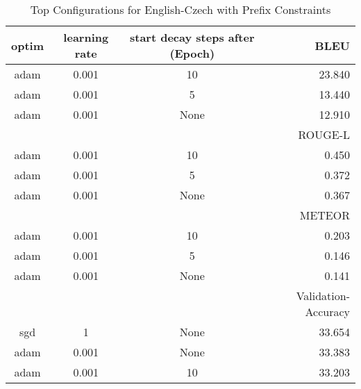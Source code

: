 \begin{table}
	\caption{Top Configurations for English-Czech with Prefix Constraints}
	\label{tab:optim_tagged-cs-en}
	\centering
\begin{tabular}{|c|c|c|r|}
	\hline
	optim   & learning rate & start decay steps after (Epoch)  & BLEU\\
	\hline
		adam   &     0.001     &       10    & 23.840 \\
		adam   &     0.001     &       5     & 13.440 \\
		adam   &     0.001     &       None  & 12.910 \\
	\hline
	\hline
	& & & ROUGE-L \\
	\hline
		   adam   &     0.001     &       10    & 0.450\\
		   adam   &     0.001     &       5     & 0.372\\
		   adam   &     0.001     &       None  & 0.367\\ 
	\hline
	\hline
	& & & METEOR \\
	\hline
		   adam   &     0.001     &       10    & 0.203 \\
		   adam   &     0.001     &       5     & 0.146 \\
		   adam   &     0.001     &       None  & 0.141 \\
	\hline
	\hline
	& & & Validation-Accuracy \\
	\hline
		   sgd    &       1       &       None  & 33.654 \\
		   adam   &     0.001     &       None  & 33.383 \\
		   adam   &     0.001     &       10    & 33.203 \\
	\hline
\end{tabular}
\end{table}
